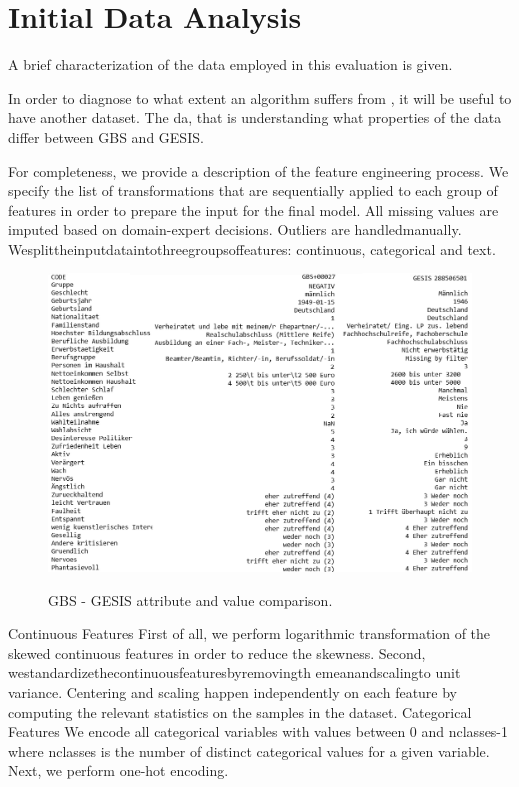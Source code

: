 \chapter{Initial Data Analysis}\label{Sec:Initial Data Analysis}

A brief characterization of the data employed in this evaluation is given. 

In order to diagnose to what extent an algorithm suffers from , it will be useful to have another dataset.
The da, that is understanding what properties of the data differ between GBS and GESIS. 

For completeness, we provide a description of the feature engineering process. We specify the list of transformations that are sequentially applied to each group of features in order to prepare the input for the ﬁnal model. All
missing values are imputed based on domain-expert decisions. Outliers are handledmanually. Wesplittheinputdataintothreegroupsoffeatures: continuous, categorical and text.

\begin{figure}[ht]
	\begin{center}
		\includegraphics[scale=0.53,angle=0]{fig/values_compare}
		\label{std}
		\caption{GBS - GESIS attribute and value comparison.}
	\end{center}
\end{figure}

Continuous Features First of all, we perform logarithmic transformation of the skewed continuous features in order to reduce the skewness. Second, westandardizethecontinuousfeaturesbyremovingth emeanandscalingto unit variance. Centering and scaling happen independently on each feature by computing the relevant statistics on the samples in the dataset.
Categorical Features We encode all categorical variables with values between 0 and nclasses-1 where nclasses is the number of distinct categorical values for a given variable. Next, we perform one-hot encoding.

